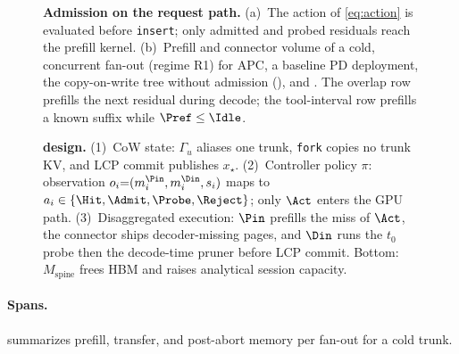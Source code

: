 
\begin{figure}[t]
\centering
\resizebox{\textwidth}{!}{}
\caption{\textbf{Admission on the request path.}
(a)~The action of \eqref{eq:action} is evaluated before \texttt{insert}; only admitted and probed residuals reach the prefill kernel.
(b)~Prefill and connector volume of a cold, concurrent fan-out (regime R1) for APC, a baseline PD deployment, the copy-on-write tree without admission (\cowonly), and \sys.
The overlap row prefills the next residual during decode; the tool-interval row prefills a known suffix while $\Pref\le\Idle$.}
\label{fig:app}
\end{figure}

\begin{figure}[t]
\centering
\resizebox{\textwidth}{!}{}
\caption{\textbf{\sys{} design.}
(1)~CoW state: $\Gamma_u$ aliases one trunk, \texttt{fork} copies no trunk KV, and LCP commit publishes $x_\star$.
(2)~Controller policy $\pi$: observation $o_i{=}(m_i^{\Pin},m_i^{\Din},s_i)$ maps to $a_i\in\{\Hit,\Admit,\Probe,\Reject\}$; only $\Act$ enters the GPU path.
(3)~Disaggregated execution: $\Pin$ prefills the miss of $\Act$, the connector ships decoder-missing pages, and $\Din$ runs the $t_0$ probe then the decode-time pruner before LCP commit.
Bottom: $M_{\mathrm{spine}}$ frees HBM and raises analytical session capacity.}
\label{fig:arch-detail}
\end{figure}

\paragraph{Spans.}
 summarizes prefill, transfer, and post-abort memory per fan-out for a cold trunk.

